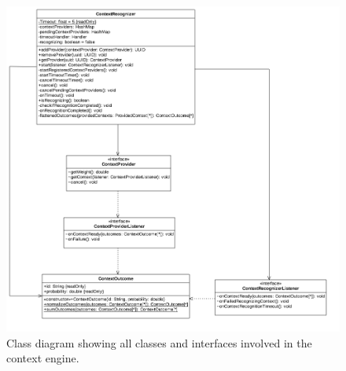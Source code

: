 \begin{figure}[h!]
\centering
\includegraphics[width=\textwidth]{images/uml-context-engine}
\caption{Class diagram showing all classes and interfaces involved in the context engine.}
\label{fig:design:context-engine:class-diagram}
\end{figure}

